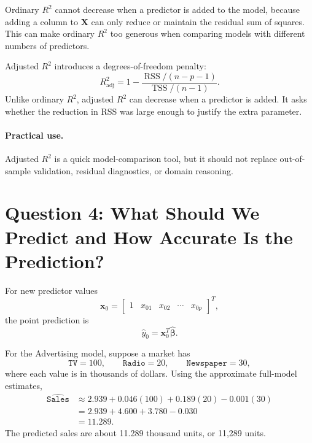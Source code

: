 Ordinary \(R^2\) cannot decrease when a predictor is added to the model, because adding a column to \(\mathbf{X}\) can only reduce or maintain the residual sum of squares.  This can make ordinary \(R^2\) too generous when comparing models with different numbers of predictors.

Adjusted \(R^2\) introduces a degrees-of-freedom penalty:
\begin{equation}
  R^2_{\text{adj}}
  =1-\frac{\operatorname{RSS}/(n-p-1)}{\operatorname{TSS}/(n-1)}.
\end{equation}
Unlike ordinary \(R^2\), adjusted \(R^2\) can decrease when a predictor is added.  It asks whether the reduction in RSS was large enough to justify the extra parameter.

\paragraph{Practical use.}
Adjusted \(R^2\) is a quick model-comparison tool, but it should not replace out-of-sample validation, residual diagnostics, or domain reasoning.

\section{Question 4: What Should We Predict and How Accurate Is the Prediction?}

For new predictor values
\begin{equation}
  \mathbf{x}_0=\begin{bmatrix}1 & x_{01} & x_{02} & \cdots & x_{0p}\end{bmatrix}^T,
\end{equation}
the point prediction is
\begin{equation}
  \boxed{\widehat{y}_0=\mathbf{x}_0^T\widehat{\boldsymbol{\beta}}.}
\end{equation}

For the Advertising model, suppose a market has
\begin{equation}
  \texttt{TV}=100,\qquad \texttt{Radio}=20,\qquad \texttt{Newspaper}=30,
\end{equation}
where each value is in thousands of dollars.  Using the approximate full-model estimates,
\begin{align}
  \widehat{\texttt{Sales}}
  &\approx 2.939+0.046(100)+0.189(20)-0.001(30)\\
  &=2.939+4.600+3.780-0.030\\
  &=11.289.
\end{align}
The predicted sales are about 11.289 thousand units, or 11,289 units.

